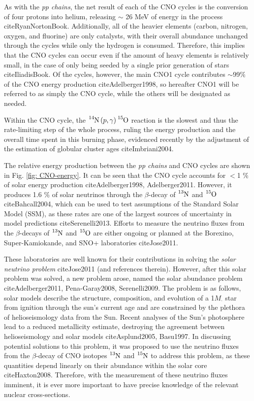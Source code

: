 \noindent As with the \textit{pp chains}, the net result of each of the CNO cycles is the conversion of four protons into helium, releasing $\sim$ 26 MeV of energy in the process cite{RyanNortonBook}. Additionally, all of the heavier elements (carbon, nitrogen, oxygen, and fluorine) are only catalysts, with their overall abundance unchanged through the cycles while only the hydrogen is consumed. Therefore, this implies that the CNO cycles can occur even if the amount of heavy elements is relatively small, in the case of only being seeded by a single prior generation of stars cite{IliadisBook}. Of the cycles, however, the main CNO1 cycle contributes $\sim$99$\%$ of the CNO energy production cite{Adelberger1998}, so hereafter CNO1 will be referred to as simply the CNO cycle, while the others will be designated as needed. 

Within the CNO cycle, the $\ce{^{14}N} \left( p, \gamma \right) \ce{^{15}O}$ reaction is the slowest and thus the rate-limiting step of the whole process, ruling the energy production and the overall time spent in this burning phase, evidenced recently by the adjustment of the estimation of globular cluster ages cite{Imbriani2004}.

The relative energy production between the \textit{pp chains} and CNO cycles are shown in Fig. \ref{fig: CNO-energy}. It can be seen that the CNO cycle accounts for $< $1 \% of solar energy production cite{Adelberger1998, Adelberger2011}. However, it produces 1.6 \% of solar neutrinos through the $\beta$-decay of $\ce{^{13}N}$ and $\ce{^{15}O}$ cite{Bahcall2004}, which can be used to test assumptions of the Standard Solar Model (SSM), as these rates are one of the largest sources of uncertainty in model predictions cite{Serenelli2013}. Efforts to measure the neutrino fluxes from the $\beta$-decays of $\ce{^{13}N}$ and $\ce{^{15}O}$ are either ongoing or planned at the Borexino, Super-Kamiokande, and SNO+ laboratories cite{Jose2011}.

These laboratories are well known for their contributions in solving the \textsl{solar neutrino problem} cite{Jose2011} (and references therein). However, after this solar problem was solved, a new problem arose, named the solar abundance problem cite{Adelberger2011, Pena-Garay2008, Serenelli2009}. The problem is as follows, solar models describe the structure, composition, and evolution of a 1$M_{\cdot}$ star from ignition through the sun's current age and are constrained by the plethora of helioseismology data from the Sun. Recent analyses of the Sun's photosphere lead to a reduced metallicity estimate, destroying the agreement between helioseismology and solar models cite{Asplund2005, Basu1997}. In discussing potential solutions to this problem, it was proposed to use the neutrino fluxes from the $\beta$-decay of CNO isotopes $\ce{^{13}N}$ and $\ce{^{15}N}$ to address this problem, as these quantities depend linearly on their abundance within the solar core cite{Haxton2008}. Therefore, with the measurement of these neutrino fluxes imminent, it is ever more important to have precise knowledge of the relevant nuclear cross-sections.  



